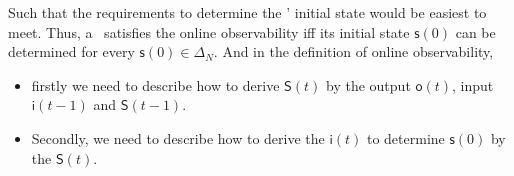 Such that the requirements to determine the \BCNs' initial state would be easiest to meet. Thus, a \BCN\ satisfies the online observability iff its initial state $\mathsf{s}(0)$ can be determined for every $\mathsf{s}(0) \in \Delta_N$. And in the definition of online observability, 

\begin{itemize}
\item firstly we need to describe how to derive $\mathsf{S}(t)$ by the output $\mathsf{o}(t)$, input $\mathsf{i}(t-1)$ and $\mathsf{S}(t-1)$. %
\item  Secondly, we need to describe how to derive the $\mathsf{i}(t)$ to determine $\mathsf{s}(0)$ by the $\mathsf{S}(t)$. %
\end{itemize} 

